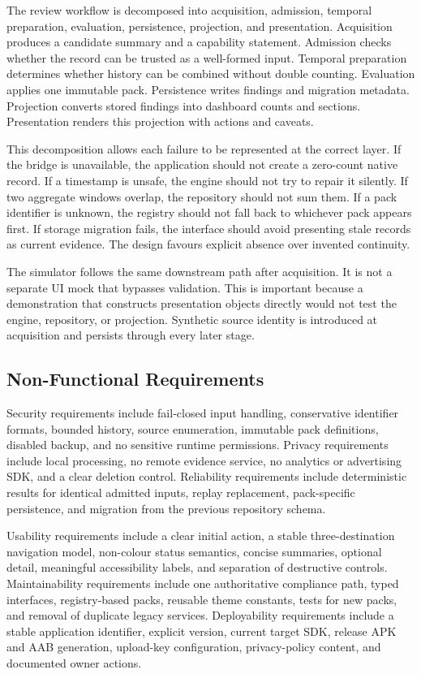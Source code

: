 The review workflow is decomposed into acquisition, admission, temporal preparation, evaluation, persistence, projection, and presentation. Acquisition produces a candidate summary and a capability statement. Admission checks whether the record can be trusted as a well-formed input. Temporal preparation determines whether history can be combined without double counting. Evaluation applies one immutable pack. Persistence writes findings and migration metadata. Projection converts stored findings into dashboard counts and sections. Presentation renders this projection with actions and caveats.

This decomposition allows each failure to be represented at the correct layer. If the bridge is unavailable, the application should not create a zero-count native record. If a timestamp is unsafe, the engine should not try to repair it silently. If two aggregate windows overlap, the repository should not sum them. If a pack identifier is unknown, the registry should not fall back to whichever pack appears first. If storage migration fails, the interface should avoid presenting stale records as current evidence. The design favours explicit absence over invented continuity.

The simulator follows the same downstream path after acquisition. It is not a separate UI mock that bypasses validation. This is important because a demonstration that constructs presentation objects directly would not test the engine, repository, or projection. Synthetic source identity is introduced at acquisition and persists through every later stage.

\subsection{Non-Functional Requirements}

Security requirements include fail-closed input handling, conservative identifier formats, bounded history, source enumeration, immutable pack definitions, disabled backup, and no sensitive runtime permissions. Privacy requirements include local processing, no remote evidence service, no analytics or advertising SDK, and a clear deletion control. Reliability requirements include deterministic results for identical admitted inputs, replay replacement, pack-specific persistence, and migration from the previous repository schema.

Usability requirements include a clear initial action, a stable three-destination navigation model, non-colour status semantics, concise summaries, optional detail, meaningful accessibility labels, and separation of destructive controls. Maintainability requirements include one authoritative compliance path, typed interfaces, registry-based packs, reusable theme constants, tests for new packs, and removal of duplicate legacy services. Deployability requirements include a stable application identifier, explicit version, current target SDK, release APK and AAB generation, upload-key configuration, privacy-policy content, and documented owner actions.

